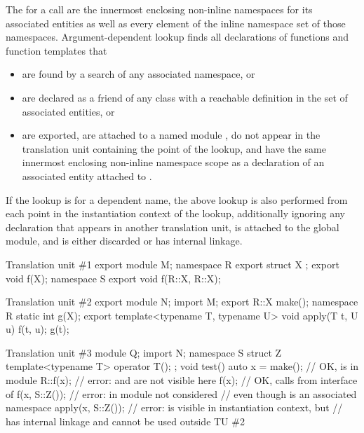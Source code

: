 \pnum
The  for a call are
the innermost enclosing non-inline namespaces for its associated entities
as well as every element of the inline namespace set
of those namespaces.
Argument-dependent lookup finds
all declarations of functions and function templates that
\begin{itemize}
\item
are found by a search of any associated namespace, or
\item
are declared as a friend of any class
with a reachable definition in the set of associated entities, or
\item
are exported,
are attached to a named module ,
do not appear in the translation unit containing the point of the lookup, and
have the same innermost enclosing non-inline namespace scope as
a declaration of an associated entity attached to .
\end{itemize}
If the lookup is for a dependent name,
the above lookup is also performed
from each point in the instantiation context of the lookup,
additionally ignoring any declaration that
appears in another translation unit,
is attached to the global module, and
is either discarded or has internal linkage.

\pnum
\begin{example}
\begin{codeblocktu}{Translation unit \#1}
export module M;
namespace R {
  export struct X {};
  export void f(X);
}
namespace S {
  export void f(R::X, R::X);
}
\end{codeblocktu}

\begin{codeblocktu}{Translation unit \#2}
export module N;
import M;
export R::X make();
namespace R { static int g(X); }
export template<typename T, typename U> void apply(T t, U u) {
  f(t, u);
  g(t);
}
\end{codeblocktu}

\begin{codeblocktu}{Translation unit \#3}
module Q;
import N;
namespace S {
  struct Z { template<typename T> operator T(); };
}
void test() {
  auto x = make();              // OK,  is  in module 
  R::f(x);                      // error:  and  are not visible here
  f(x);                         // OK, calls  from interface of 
  f(x, S::Z());                 // error:  in module  not considered
                                // even though  is an associated namespace
  apply(x, S::Z());             // error:  is visible in instantiation context, but
                                //  has internal linkage and cannot be used outside TU \#2
}
\end{codeblocktu}
\end{example}

